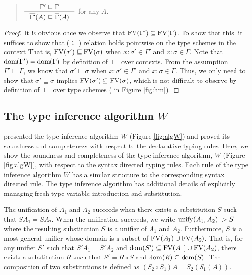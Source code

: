 \begin{lemma}
\begin{quote}
$ \inference{\Gamma' \sqsubseteq \Gamma}
            {\overline{\Gamma'}(A) \sqsubseteq \overline{\Gamma}(A)} $
for any $A$.
\end{quote}
\label{lem:closureMoreGen}
\end{lemma}
\begin{proof}
It is obvious once we observe that $\mathop{\mathrm{FV}}(\Gamma') \subseteq \mathop{\mathrm{FV}}(\Gamma)$.
To show that this, it suffices to show that ($\subseteq$) relation holds
pointwise on the type schemes in the context That is,
$\mathop{\mathrm{FV}}(\sigma')\sqsubseteq\mathop{\mathrm{FV}}(\sigma)$ when $x:\sigma' \in \Gamma'$
and $x:\sigma \in \Gamma$. Note that $\mathop{\mathrm{dom}}(\Gamma')=\mathop{\mathrm{dom}}(\Gamma)$
by definition of $\sqsubseteq$ over contexts.
From the assumption $\Gamma' \sqsubseteq \Gamma$, we know that
$\sigma'\sqsubseteq\sigma$ when $x:\sigma' \in \Gamma'$
and $x:\sigma \in \Gamma$. Thus, we only need to show that
$\sigma' \sqsubseteq \sigma$ implies $\mathop{\mathrm{FV}}(\sigma') \subseteq \mathop{\mathrm{FV}}(\sigma)$,
which is not difficult to observe by definition of $\sqsubseteq$ over
type schemes ( in Figure \ref{fig:hm}).
\end{proof}

\subsection{The type inference algorithm $W$}\label{sec:hm:W}
\citet{DamMil82} presented the type inference algorithm $W$
(Figure \ref{fig:algW}) and proved its soundness and completeness
with respect to the declarative typing rules. Here, we show the
soundness and completeness of the type inference algorithm, $W$ (Figure \ref{fig:algW}),
with respect to the syntax directed typing rules.
Each rule of the type inference algorithm $W$
has a similar structure to the corresponding syntax directed rule.
The type inference algorithm has additional details of explicitly
managing fresh type variable introduction and substitution.

The unification of $A_1$ and $A_2$ succeeds when there exists a substitution $S$
such that $S A_1 = S A_2$.  When the unification succeeds,
we write $\mathop{\mathrm{unify}}(A_1,A_2) ~> S$, where the resulting substitution $S$ is
a unifier of $A_1$ and $A_2$.  Furthermore, $S$ is a most general unifier
\cite{Herbrand30,Robinson65} whose domain is a subset of $\mathop{\mathrm{FV}}(A_1)\cup\mathop{\mathrm{FV}}(A_2)$.
That is, for any unifier $S'$ such that $S' A_1 = S' A_2$ and
$\mathop{\mathrm{dom}}(S') \subseteq \mathop{\mathrm{FV}}(A_1) \cup \mathop{\mathrm{FV}}(A_2)$,
there exists a substitution $R$ such that $S' = R\circ S$ and
$\mathop{\mathrm{dom}}(R)\subseteq\mathop{\mathrm{dom}}(S)$. The composition of two substitutions
is defined as $(S_2\circ S_1)A = S_2(S_1(A))$.

